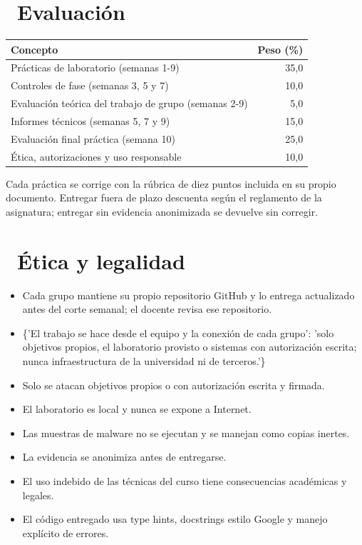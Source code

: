 \documentclass[11pt,a4paper]{article}
\newcommand{\iconotexto}[2]{\textcolor{cyanNeon}{\faIcon{#1}}~#2}
\begin{document}
\section{\iconotexto{clipboard-check}{Evaluación}}

\begin{tabularx}{\linewidth}{@{}X r@{}}
\toprule
Concepto & Peso (\%)\\
\midrule
Prácticas de laboratorio (semanas 1-9) & 35,0 \\
Controles de fase (semanas 3, 5 y 7) & 10,0 \\
Evaluación teórica del trabajo de grupo (semanas 2-9) & 5,0 \\
Informes técnicos (semanas 5, 7 y 9) & 15,0 \\
Evaluación final práctica (semana 10) & 25,0 \\
Ética, autorizaciones y uso responsable & 10,0 \\
\bottomrule
\end{tabularx}

Cada práctica se corrige con la rúbrica de diez puntos incluida en su propio documento. Entregar fuera de plazo descuenta según el reglamento de la asignatura; entregar sin evidencia anonimizada se devuelve sin corregir.

\section{\iconotexto{balance-scale}{Ética y legalidad}}

\begin{itemize}[leftmargin=1.4em,itemsep=2pt,topsep=3pt]
  \item Cada grupo mantiene su propio repositorio GitHub y lo entrega actualizado antes del corte semanal; el docente revisa ese repositorio.
  \item \{'El trabajo se hace desde el equipo y la conexión de cada grupo': 'solo objetivos propios, el laboratorio provisto o sistemas con autorización escrita; nunca infraestructura de la universidad ni de terceros.'\}
  \item Solo se atacan objetivos propios o con autorización escrita y firmada.
  \item El laboratorio es local y nunca se expone a Internet.
  \item Las muestras de malware no se ejecutan y se manejan como copias inertes.
  \item La evidencia se anonimiza antes de entregarse.
  \item El uso indebido de las técnicas del curso tiene consecuencias académicas y legales.
  \item El código entregado usa type hints, docstrings estilo Google y manejo explícito de errores.
\end{itemize}
\end{document}
